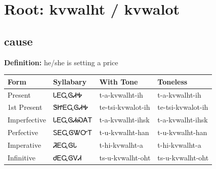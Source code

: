 \documentclass{article}%
\begin{document}
%
\normalsize%
\section*{Root: kvwalht / kvwalot}%
\subsection*{cause}%
\textbf{Definition: }%
he/she is setting a price%
\\[0.5em]%
\begin{tabular}{|l|l|l|l|}%
\hline%
\textbf{Form}&\textbf{Syllabary}&\textbf{With Tone}&\textbf{Toneless}\\%
\hline%
Present&ᏓᎬᏩᎶᏗᎭ&t{-}a{-}kvwalht{-}ih&t{-}a{-}kvwalht{-}ih\\%
1st Present&ᏕᏥᎬᏩᎶᏗᎭ&te{-}tsi{-}kvwalot{-}ih&te{-}tsi{-}kvwalot{-}ih\\%
Imperfective&ᏓᎬᏩᎶᏗᏍᎪᎢ&t{-}a{-}kvwalht{-}ihsk&t{-}a{-}kvwalht{-}ihsk\\%
Perfective&ᏚᎬᏩᎶᏔᏅᎢ&t{-}u{-}kvwalht{-}han&t{-}u{-}kvwalht{-}han\\%
Imperative&ᏘᎬᏩᎶᏓ&t{-}hi{-}kvwalht{-}a&t{-}hi{-}kvwalht{-}a\\%
Infinitive&ᏧᎬᏩᎶᏙᏗ&ts{-}u{-}kvwalht{-}oht&ts{-}u{-}kvwalht{-}oht\\%
\hline%
\end{tabular}%
\\[1em]%
\end{document}
